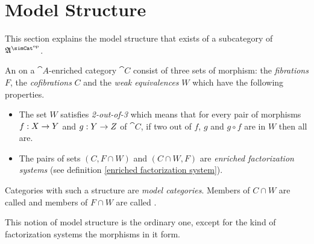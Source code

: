 \documentclass[csh.tex]{subfiles}
\begin{document}
\section{Model Structure}
This section explains the model structure that exists of a subcategory of $\ambient\s$.


\begin{definition} An  on a $\cat A$-enriched category $\cat C$ consist of three sets of morphism: the \emph{fibrations} $F$, the \emph{cofibrations} $C$ and the \emph{weak equivalences} $W$ which have the following properties. 
\begin{itemize}
\item The set $W$ satisfies \emph{2-out-of-3} which means that for every pair of morphisms $f: X\to Y$ and $g: Y\to Z$ of $\cat C$, if two out of $f$, $g$ and $g\circ f$ are in $W$ then all are. 
\item The pairs of sets $(C,F\cap W)$ and $(C\cap W,F)$ are \emph{enriched factorization systems} (see definition \ref{enriched factorization system}). 
\end{itemize}

Categories with such a structure are \emph{model categories}. Members of $C\cap W$ are called  and members of $F\cap W$ are called .
\end{definition}

This notion of model structure is the ordinary one, except for the kind of factorization systems the morphisms in it form.
\end{document}
